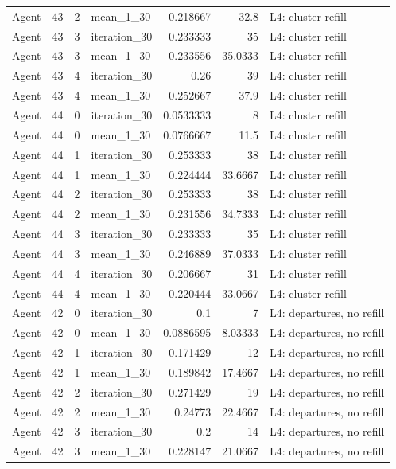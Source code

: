 \begin{table}[htbp!]
\begin{tabular}{lrrlrrl}
Agent & 43 & 2 & mean\_1\_30 & 0.218667 & 32.8 & L4: cluster refill \\
Agent & 43 & 3 & iteration\_30 & 0.233333 & 35 & L4: cluster refill \\
Agent & 43 & 3 & mean\_1\_30 & 0.233556 & 35.0333 & L4: cluster refill \\
Agent & 43 & 4 & iteration\_30 & 0.26 & 39 & L4: cluster refill \\
Agent & 43 & 4 & mean\_1\_30 & 0.252667 & 37.9 & L4: cluster refill \\
Agent & 44 & 0 & iteration\_30 & 0.0533333 & 8 & L4: cluster refill \\
Agent & 44 & 0 & mean\_1\_30 & 0.0766667 & 11.5 & L4: cluster refill \\
Agent & 44 & 1 & iteration\_30 & 0.253333 & 38 & L4: cluster refill \\
Agent & 44 & 1 & mean\_1\_30 & 0.224444 & 33.6667 & L4: cluster refill \\
Agent & 44 & 2 & iteration\_30 & 0.253333 & 38 & L4: cluster refill \\
Agent & 44 & 2 & mean\_1\_30 & 0.231556 & 34.7333 & L4: cluster refill \\
Agent & 44 & 3 & iteration\_30 & 0.233333 & 35 & L4: cluster refill \\
Agent & 44 & 3 & mean\_1\_30 & 0.246889 & 37.0333 & L4: cluster refill \\
Agent & 44 & 4 & iteration\_30 & 0.206667 & 31 & L4: cluster refill \\
Agent & 44 & 4 & mean\_1\_30 & 0.220444 & 33.0667 & L4: cluster refill \\
Agent & 42 & 0 & iteration\_30 & 0.1 & 7 & L4: departures, no refill \\
Agent & 42 & 0 & mean\_1\_30 & 0.0886595 & 8.03333 & L4: departures, no refill \\
Agent & 42 & 1 & iteration\_30 & 0.171429 & 12 & L4: departures, no refill \\
Agent & 42 & 1 & mean\_1\_30 & 0.189842 & 17.4667 & L4: departures, no refill \\
Agent & 42 & 2 & iteration\_30 & 0.271429 & 19 & L4: departures, no refill \\
Agent & 42 & 2 & mean\_1\_30 & 0.24773 & 22.4667 & L4: departures, no refill \\
Agent & 42 & 3 & iteration\_30 & 0.2 & 14 & L4: departures, no refill \\
Agent & 42 & 3 & mean\_1\_30 & 0.228147 & 21.0667 & L4: departures, no refill \\

\end{tabular}
\end{table}
